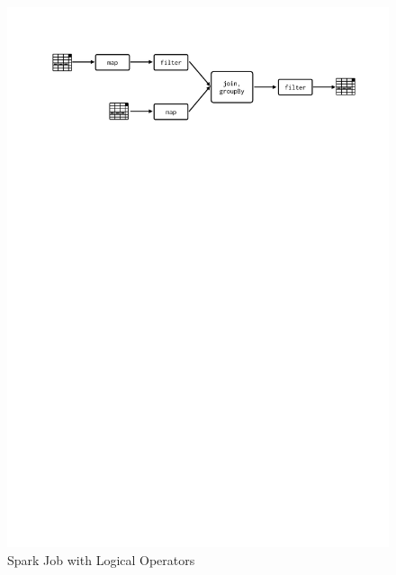 \begin{figure}[h!]
    \centering
    \includegraphics[clip,trim=2.3cm 23.5cm 1.7cm 2.5cm,scale=0.97]{stage-logical.pdf}
    \caption{Spark Job with Logical Operators}
    \label{fig:sp:logical}

\end{figure}
